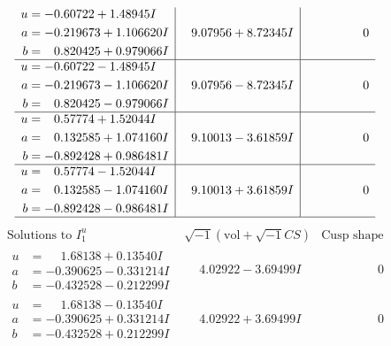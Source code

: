\documentclass[1p]{elsarticle_modified}
\theoremstyle{definition}
\newcommand{\I}{\sqrt{-1}}
\begin{document}
$$\begin{array}{c|c|c}
\begin{aligned}
u &= -0.60722 + 1.48945 I \\
a &= -0.219673 + 1.106620 I \\
b &= \phantom{-}0.820425 + 0.979066 I\end{aligned}
 & \phantom{-}9.07956 + 8.72345 I & \phantom{-0.000000 } 0 \\ \hline\begin{aligned}
u &= -0.60722 - 1.48945 I \\
a &= -0.219673 - 1.106620 I \\
b &= \phantom{-}0.820425 - 0.979066 I\end{aligned}
 & \phantom{-}9.07956 - 8.72345 I & \phantom{-0.000000 } 0 \\ \hline\begin{aligned}
u &= \phantom{-}0.57774 + 1.52044 I \\
a &= \phantom{-}0.132585 + 1.074160 I \\
b &= -0.892428 + 0.986481 I\end{aligned}
 & \phantom{-}9.10013 - 3.61859 I & \phantom{-0.000000 } 0 \\ \hline\begin{aligned}
u &= \phantom{-}0.57774 - 1.52044 I \\
a &= \phantom{-}0.132585 - 1.074160 I \\
b &= -0.892428 - 0.986481 I\end{aligned}
 & \phantom{-}9.10013 + 3.61859 I & \phantom{-0.000000 } 0\\
 \hline 
 \end{array}$$\newpage$$\begin{array}{c|c|c}  
\text{Solutions to }I^u_{1}& \I (\text{vol} + \sqrt{-1}CS) & \text{Cusp shape}\\
 \hline 
\begin{aligned}
u &= \phantom{-}1.68138 + 0.13540 I \\
a &= -0.390625 - 0.331214 I \\
b &= -0.432528 - 0.212299 I\end{aligned}
 & \phantom{-}4.02922 - 3.69499 I & \phantom{-0.000000 } 0 \\ \hline\begin{aligned}
u &= \phantom{-}1.68138 - 0.13540 I \\
a &= -0.390625 + 0.331214 I \\
b &= -0.432528 + 0.212299 I\end{aligned}
 & \phantom{-}4.02922 + 3.69499 I & \phantom{-0.000000 } 0 \\ \hline\begin{aligned}

\end{aligned}
\end{array}$$
\end{document}
